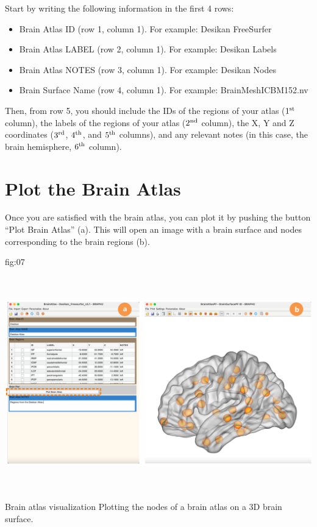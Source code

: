 \documentclass[justified]{tufte-handout}
\begin{document}
Start by writing the following information in the first 4 rows:
\begin{itemize}

\item Brain Atlas ID (row 1, column 1). 
For example: Desikan FreeSurfer

\item Brain Atlas LABEL (row 2, column 1). 
For example: Desikan Labels

\item Brain Atlas NOTES (row 3, column 1).
For example: Desikan Nodes

\item Brain Surface Name (row 4, column 1).
For example: BrainMeshICBM152.nv

\end{itemize}
Then, from row 5, you should include the IDs of the regions of your atlas ($1^{\rm st}$ column), the labels of the regions of your atlas ($2^{\rm nd}$ column), the X, Y and Z coordinates ($3^{\rm rd}$, $4^{\rm th}$, and $5^{\rm th}$ columns), and any relevant notes (in this case, the brain hemisphere, $6^{\rm th}$ column).	

\clearpage
\section{Plot the Brain Atlas}

Once you are satisfied with the brain atlas, you can plot it by pushing the button ``Plot Brain Atlas'' (a). 
This will open an image with a brain surface and nodes corresponding to the brain regions (b).

	{fig:07}
	{\includegraphics[height=10cm]{tut_ba/fig07.png}}
	{Brain atlas visualization}
	{
	Plotting the nodes of a brain atlas on a 3D brain surface. 
	}
	
\end{document}
